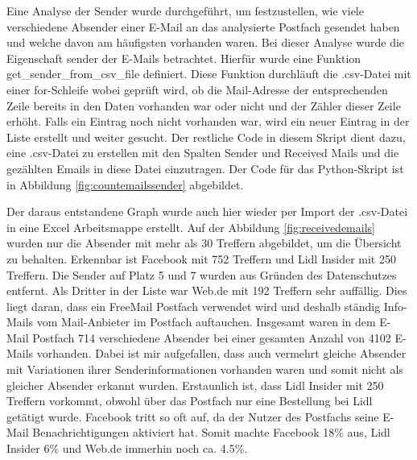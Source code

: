 \noindent Eine Analyse der Sender wurde durchgeführt, um festzustellen, wie viele verschiedene Absender einer E-Mail an das analysierte Postfach gesendet haben und welche davon am häufigsten vorhanden waren. Bei dieser Analyse wurde die Eigenschaft \glqq{}sender\grqq{} der E-Mails betrachtet. Hierfür wurde eine Funktion \glqq{}get\_sender\_from\_csv\_file\grqq{} definiert. Diese Funktion durchläuft die .csv-Datei mit einer for-Schleife wobei geprüft wird, ob die Mail-Adresse der entsprechenden Zeile bereits in den Daten vorhanden war oder nicht und der Zähler dieser Zeile erhöht. Falls ein Eintrag noch nicht vorhanden war, wird ein neuer Eintrag in der Liste erstellt und weiter gesucht. Der restliche Code in diesem Skript dient dazu, eine .csv-Datei zu erstellen mit den Spalten \glqq{}Sender\grqq{} und \glqq{}Received Mails\grqq{} und die gezählten Emails in diese Datei einzutragen. Der Code für das Python-Skript ist in Abbildung \ref{fig:countemailssender} abgebildet. \smallskip

\noindent Der daraus entstandene Graph wurde auch hier wieder per Import der .csv-Datei in eine Excel Arbeitsmappe erstellt. Auf der Abbildung \ref{fig:receivedemails} wurden nur die Absender mit mehr als 30 Treffern abgebildet, um die Übersicht zu behalten. Erkennbar ist Facebook mit 752 Treffern und Lidl Insider mit 250 Treffern. Die Sender auf Platz 5 und 7 wurden aus Gründen des Datenschutzes entfernt. Als Dritter in der Liste war Web.de mit 192 Treffern sehr auffällig. Dies liegt daran, dass ein FreeMail Postfach verwendet wird und deshalb ständig \glqq{}Info-Mails\grqq{} vom Mail-Anbieter im Postfach auftauchen. Insgesamt waren in dem E-Mail Postfach 714 verschiedene Absender bei einer gesamten Anzahl von 4102 E-Mails vorhanden. Dabei ist mir aufgefallen, dass auch vermehrt gleiche Absender mit Variationen ihrer Senderinformationen vorhanden waren und somit nicht als gleicher Absender erkannt wurden. Erstaunlich ist, dass Lidl Insider mit 250 Treffern vorkommt, obwohl über das Postfach nur eine Bestellung bei Lidl getätigt wurde. Facebook tritt so oft auf, da der Nutzer des Postfachs seine E-Mail Benachrichtigungen aktiviert hat. Somit machte Facebook 18\% aus, Lidl Insider 6\% und Web.de immerhin noch ca. 4.5\%. \smallskip

